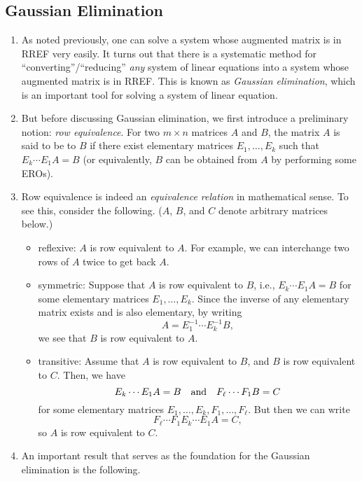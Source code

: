 \subsection{Gaussian Elimination}
\begin{enumerate}
\item As noted previously, one can solve a system whose augmented matrix is in
RREF very easily. It turns out that there is a systematic method for
``converting''/``reducing'' \emph{any} system of linear equations into a system
whose augmented matrix is in RREF. This is known as \emph{Gaussian
elimination}, which is an important tool for solving a system of linear
equation.

\item But before discussing Gaussian elimination, we first introduce a
preliminary notion: \emph{row equivalence}. For two \(m\times n\) matrices
\(A\) and \(B\), the matrix \(A\) is said to be  to \(B\)
if there exist elementary matrices \(E_1,\dotsc,E_k\) such that \(E_k\dotsb
E_1A=B\) (or equivalently, \(B\) can be obtained from \(A\) by performing some
EROs).

\item \label{it:row-equiv-equiv-relation}
Row equivalence is indeed an \emph{equivalence relation} in mathematical sense.
To see this, consider the following. (\(A\), \(B\), and \(C\) denote arbitrary
matrices below.)
\begin{itemize}
\item reflexive: \(A\) is row equivalent to \(A\). For example, we can
interchange two rows of \(A\) twice to get back \(A\).

\item symmetric: Suppose that \(A\) is row equivalent to \(B\), i.e., \(E_k\dotsb
E_1A=B\) for some elementary matrices \(E_1,\dotsc,E_k\). Since the
inverse of any elementary matrix exists and is also elementary, by writing
\[
A=E_1^{-1}\dotsb E_k^{-1}B,
\]
we see that \(B\) is row equivalent to \(A\).

\item transitive: Assume that \(A\) is row equivalent to \(B\), and \(B\) is row
equivalent to \(C\). Then, we have
\[
E_{k}\dotsb E_{1}A=B\qqtext{and}
F_{\ell}\dotsb F_1B=C
\]
for some elementary matrices \(E_1,\dotsc,E_k,F_1,\dotsc,F_{\ell}\). But then
we can write
\[
F_{\ell}\dotsb F_1E_{k}\dotsb E_{1}A=C,
\]
so \(A\) is row equivalent to \(C\).
\end{itemize}
\item An important result that serves as the foundation for the Gaussian
elimination is the following.


\end{enumerate}
